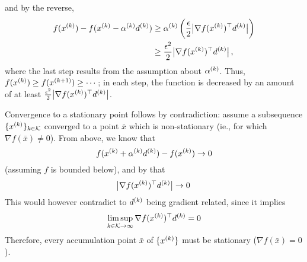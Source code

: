 \documentclass{article}
\begin{document}
and by the reverse,
\begin{align*}
  f(\kth{x}) - f(\kth{x} - \kth{\alpha}\kth{d})
  &\geq \kth{\alpha} \left(\frac{\epsilon}{2}\envert[1]{\T{\nabla f(\kth{x})} \kth{d}} \right) \\
  &\geq \frac{\epsilon^2}{2}\envert[1]{\T{\nabla f(\kth{x})} \kth{d}},
\end{align*}
where the last step results from the assumption about \(\kth{\alpha}\).  Thus,
\(f(\kth{x}) \geq f(\kth[k+1]{x}) \geq \cdots \); in each step, the function is decreased by an
amount of at least \(\frac{\epsilon^2}{2}\envert[1]{\T{\nabla f(\kth{x})} \kth{d}}\).

Convergence to a stationary point follows by contradiction: assume a subsequence
\(\{\kth{x}\}_{k \in \mathcal{K}}\) converged to a point \(\bar{x}\) which is non-stationary (ie.,
for which \(\nabla f(\bar{x}) \neq 0\)).  From above, we know that
\begin{equation*}
  f(\kth{x} + \kth{\alpha}\kth{d}) - f(\kth{x}) \to 0
\end{equation*}
(assuming \(f\) is bounded below), and by that
\begin{equation*}
\envert[1]{\T{\nabla f(\kth{x})} \kth{d}} \to 0  
\end{equation*}
This would however contradict to \(\kth{d}\) being gradient related, since it implies
\begin{equation*}
  \limsup_{k \in \mathcal{K} \to \infty} \T{\nabla f(\kth{x})} \kth{d} = 0
\end{equation*}
Therefore, every accumulation point \(\bar{x}\) of \(\{\kth{x}\}\) must be stationary
(\(\nabla f(\bar{x}) = 0\)).




\end{document}

